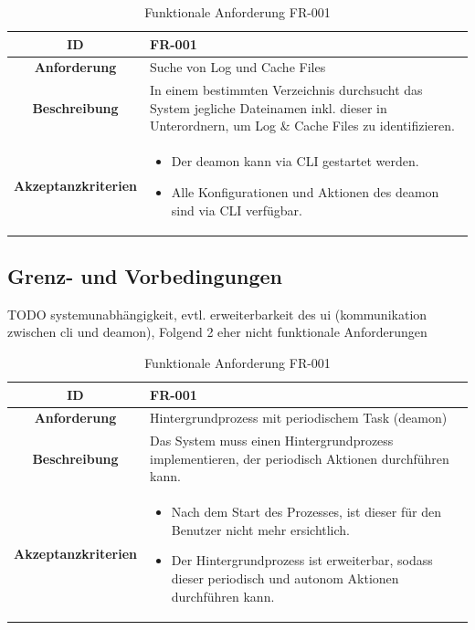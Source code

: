 \documentclass[a4paper,12pt]{report}
\begin{document}
    \begin{table}[h!]
        \centering
        \setlength{\leftmargini}{0.4cm}
        \begin{tabular}{|c|p{10cm}|}
            \hline
            \textbf{ID} & FR-001 \\ \hline
            \textbf{Anforderung} & Suche von Log und Cache Files \\ \hline
            \textbf{Beschreibung} & In einem bestimmten Verzeichnis durchsucht das System jegliche Dateinamen inkl. dieser in Unterordnern, um Log \& Cache Files zu identifizieren.  \\ \hline
            \textbf{Akzeptanzkriterien} &
            \begin{itemize}
                \item Der deamon kann via CLI gestartet werden.
                \item Alle Konfigurationen und Aktionen des deamon sind via CLI verfügbar.
            \end{itemize}
            \\ \hline
        \end{tabular}
        \caption{Funktionale Anforderung FR-001}\label{tab:table2}
    \end{table}


    \newpage
    \subsection{Grenz- und Vorbedingungen}
    TODO systemunabhängigkeit, evtl. erweiterbarkeit des ui (kommunikation zwischen cli und deamon),
    Folgend 2 eher nicht funktionale Anforderungen

    \begin{table}[h!]
        \centering
        \setlength{\leftmargini}{0.4cm}
        \begin{tabular}{|c|p{10cm}|}
            \hline
            \textbf{ID} & FR-001 \\ \hline
            \textbf{Anforderung} & Hintergrundprozess mit periodischem Task (deamon) \\ \hline
            \textbf{Beschreibung} & Das System muss einen Hintergrundprozess implementieren, der periodisch Aktionen durchführen kann. \\ \hline
            \textbf{Akzeptanzkriterien} &
            \begin{itemize}
                \item Nach dem Start des Prozesses, ist dieser für den Benutzer nicht mehr ersichtlich.
                \item Der Hintergrundprozess ist erweiterbar, sodass dieser periodisch und autonom Aktionen durchführen kann.
            \end{itemize}
            \\ \hline
        \end{tabular}
        \caption{Funktionale Anforderung FR-001}\label{tab:table}
    \end{table}
\end{document}
